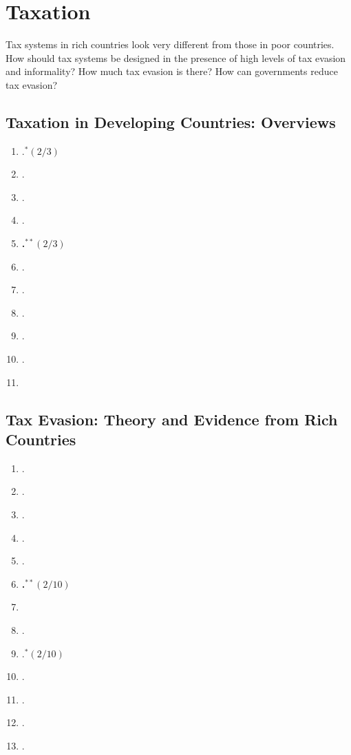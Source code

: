 \documentclass[11pt]{article}
\begin{document}
\section{Taxation}
Tax systems in rich countries look very different from those in poor countries. How should tax systems be designed in the presence of high levels of tax evasion and informality? How much tax evasion is there? How can governments reduce tax evasion?

\subsection{Taxation in Developing Countries: Overviews}

\begin{enumerate}
\item {}.$^{*}(2/3)$
\item {}.
\item {}.
\item {}.
\item \textbf{.$^{**}(2/3)$}
\item {}.
\item {}.
\item {}.
\item {}.
\item {}.
\item {}
\end{enumerate}

\subsection{Tax Evasion: Theory and Evidence from Rich Countries}

\begin{enumerate}
\item {}.
\item {}.
\item {}.
\item {}.
\item {}.
\item \textbf{.$^{**}(2/10)$}
\item {}
\item {}.
\item {}.$^{*}(2/10)$
\item {}.
\item {}.
\item {}.
\item {}.
\end{enumerate}
\end{document}
